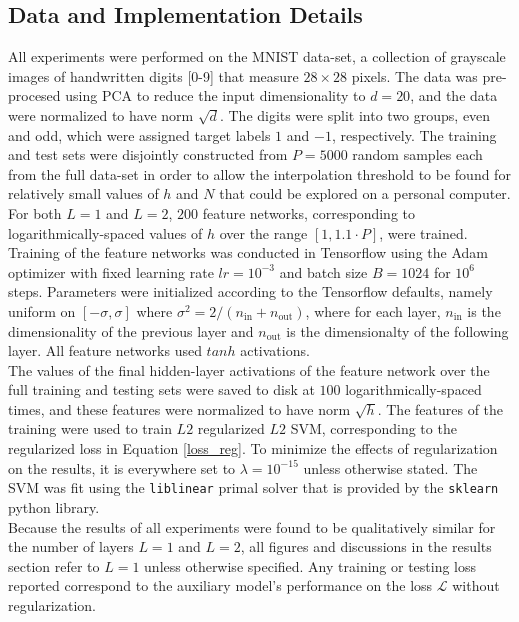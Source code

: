 \documentclass[11pt]{article}
\begin{document}
\subsection{Data and Implementation Details}

All experiments were performed on the MNIST data-set, a collection of grayscale images of handwritten digits [0-9] that measure $28\times28$ pixels. The data was pre-procesed using PCA to reduce the input dimensionality to $d=20$, and the data were normalized to have norm $\sqrt{d}$. The digits were split into two groups, even and odd, which were assigned target labels $1$ and $-1$, respectively. The training and test sets were disjointly constructed from $P=5000$ random samples each from the full data-set in order to allow the interpolation threshold to be found for relatively small values of $h$ and $N$ that could be explored on a personal computer. For both $L=1$ and $L=2$, $200$ feature networks, corresponding to logarithmically-spaced values of $h$ over the range $[1, 1.1 \cdot P]$, were trained.\\

Training of the feature networks was conducted in Tensorflow \cite{abadiTensorFlowLargeScaleMachine} using the Adam optimizer with fixed learning rate $lr=10^{-3}$ and batch size $B = 1024$ for $10^6$ steps.  Parameters were initialized according to the Tensorflow defaults, namely uniform on $[-\sigma, \sigma]$ where $\sigma^2 = 2 /(n_\text{in} + n_\text{out})$, where for each layer, $n_\text{in}$ is the dimensionality of the previous layer and $n_\text{out}$ is the dimensionalty of the following layer. All feature networks used $tanh$ activations.\\

The values of the final hidden-layer activations of the feature network over the full training and testing sets were saved to disk at $100$ logarithmically-spaced times, and these features were normalized to have norm $\sqrt{h}$. The features of the training were used to train  $L2$ regularized $L2$ SVM, corresponding to the regularized loss in Equation \eqref{loss_reg}. To minimize the effects of regularization on the results, it is everywhere set to $\lambda = 10^{-15}$ unless otherwise stated. The SVM was fit using the \texttt{liblinear} \cite{fanLIBLINEARLibraryLarge} primal solver that is provided by the \texttt{sklearn}
\cite{pedregosaScikitlearnMachineLearning} python library.\\

Because the results of all experiments were found to be qualitatively similar for the number of layers $L=1$ and $L=2$, all figures and discussions in the results section refer to $L=1$ unless otherwise specified. Any training or testing loss reported correspond to the auxiliary model's performance on the loss $\mathcal L$ without regularization.\\
\end{document}
